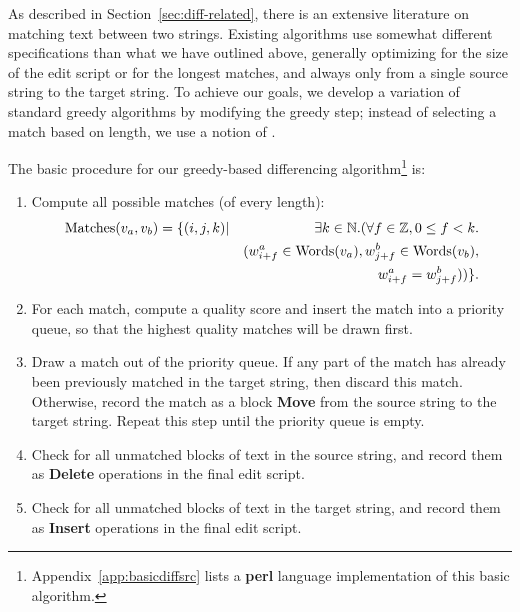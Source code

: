 As described in Section~\ref{sec:diff-related}, there is an extensive
literature on matching text between two strings.
Existing algorithms use somewhat different specifications than what
we have outlined above, generally optimizing for the size of the edit
script or for the longest matches, and always only from a single
source string to the target string.
To achieve our goals, we develop a variation of
standard greedy algorithms
by modifying the greedy step; instead of selecting a match
based on length, we use a notion of .

The basic procedure for our greedy-based differencing
algorithm\footnote{Appendix~\ref{app:basicdiffsrc} lists a
\textbf{perl} language implementation of this basic algorithm.}
is:
\begin{enumerate}
\item Compute all possible matches (of every length):
\begin{eqnarray*}
\mathrm{Matches}(v_{a}, v_{b}) = \{ (i,j,k) & |
            & \exists k \in \mathbb{N}.  (
    \forall f \in \mathbb{Z}, 0 \le f < k . \\
    & & ( w^a_{i+f} \in \mathrm{Words}(v_{a}),
    w^b_{j+f} \in \mathrm{Words}(v_{b}), \\
    & & w^a_{i+f} = w^b_{j+f} ) ) \}.
\end{eqnarray*}

\item For each match, compute a quality score and insert the match into
    a priority queue, so that the highest quality matches will
    be drawn first.
\item Draw a match out of the priority queue.
    If any part of the match has already been previously matched
    in the target string, then discard this match.
    Otherwise, record the match as a block \textbf{Move}
    from the source string to the target string.
    Repeat this step until the priority queue is empty.
\item Check for all unmatched blocks of text in the source
    string, and record them as \textbf{Delete} operations
    in the final edit script.
\item Check for all unmatched blocks of text in the target
    string, and record them as \textbf{Insert} operations
    in the final edit script.
\end{enumerate}

